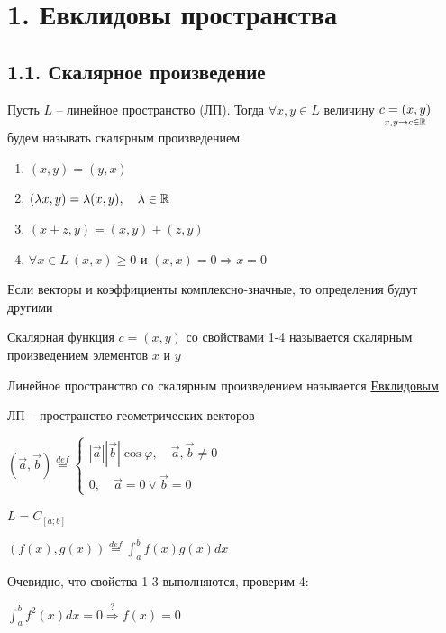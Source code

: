 \documentclass[12pt]{article}
\begin{document}
    \section{1. Евклидовы пространства}

    \subsection{1.1. Скалярное произведение}

    Пусть $L$ -- линейное пространство (ЛП). Тогда $\forall x, y \in L$ величину $\underset{x, y \to c \in \mathbb{R}}{c = (x, y)}$
    будем называть скалярным произведением


    \hypertarget{scalarproductdefinition}{}

    \begin{enumerate}
        \item $(x, y) = (y, x)$
        \item $(\lambda x, y) = \lambda (x, y), \quad \lambda \in \mathbb{R}$
        \item $(x + z, y) = (x, y) + (z, y)$
        \item $\forall x \in L\ (x, x) \geq 0$ и $(x, x) = 0 \Longrightarrow x = 0$
    \end{enumerate}

    \Notas Если векторы и коэффициенты комплексно-значные, то определения будут другими

    \Def Скалярная функция $c = (x, y)$ со свойствами 1-4 называется скалярным произведением элементов $x$ и $y$

    \hypertarget{euclidspacedefinition}{}

    \Def Линейное пространство со скалярным произведением называется \underline{Евклидовым}

     ЛП -- пространство геометрических векторов

    $(\vec{a}, \vec{b}) \stackrel{def}{=}
    \begin{cases}
        |\vec{a}||\vec{b}|\cos\varphi, \quad \vec{a}, \vec{b} \neq 0 \\
        0, \quad \vec{a} = 0 \lor \vec{b} = 0
    \end{cases}$

     $L = C_{[a;b]}$

    $(f(x), g(x)) \stackrel{def}{=} \int^b_a f(x)g(x) dx$

    Очевидно, что свойства 1-3 выполняются, проверим 4:

    $\int^b_a f^2(x) dx = 0 \stackrel{?}{\Longrightarrow} f(x) = 0$
\end{document}
